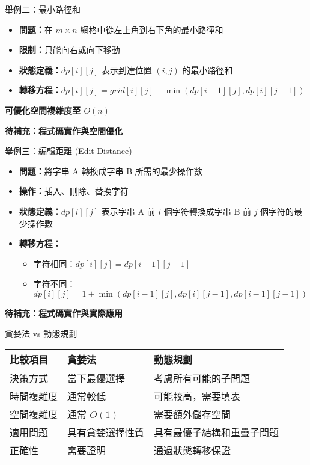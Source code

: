 \documentclass{beamer}
\begin{document}
\begin{frame}{舉例二：最小路徑和}
\begin{itemize}
    \item \textbf{問題：}在 $m \times n$ 網格中從左上角到右下角的最小路徑和
    \item \textbf{限制：}只能向右或向下移動
    \item \textbf{狀態定義：}$dp[i][j]$ 表示到達位置 $(i,j)$ 的最小路徑和
    \item \textbf{轉移方程：}$dp[i][j] = grid[i][j] + \min(dp[i-1][j], dp[i][j-1])$
\end{itemize}

\vspace{1em}
\textbf{可優化空間複雜度至 $O(n)$}

\vspace{1em}
\textbf{待補充：程式碼實作與空間優化}
\end{frame}

\begin{frame}{舉例三：編輯距離 (Edit Distance)}
\begin{itemize}
    \item \textbf{問題：}將字串 A 轉換成字串 B 所需的最少操作數
    \item \textbf{操作：}插入、刪除、替換字符
    \item \textbf{狀態定義：}$dp[i][j]$ 表示字串 A 前 $i$ 個字符轉換成字串 B 前 $j$ 個字符的最少操作數
    \item \textbf{轉移方程：}
    \begin{itemize}
        \item 字符相同：$dp[i][j] = dp[i-1][j-1]$
        \item 字符不同：$dp[i][j] = 1 + \min(dp[i-1][j], dp[i][j-1], dp[i-1][j-1])$
    \end{itemize}
\end{itemize}

\vspace{1em}
\textbf{待補充：程式碼實作與實際應用}
\end{frame}

\begin{frame}{貪婪法 vs 動態規劃}
\begin{center}
\renewcommand{\arraystretch}{1.4}
\begin{tabular}{|>{\centering\arraybackslash}m{2.5cm}|>{\raggedright\arraybackslash}m{4cm}|>{\raggedright\arraybackslash}m{4cm}|}
\hline
\textbf{比較項目} & \textbf{貪婪法} & \textbf{動態規劃} \\
\hline
決策方式 & 當下最優選擇 & 考慮所有可能的子問題 \\
\hline
時間複雜度 & 通常較低 & 可能較高，需要填表 \\
\hline
空間複雜度 & 通常 $O(1)$ & 需要額外儲存空間 \\
\hline
適用問題 & 具有貪婪選擇性質 & 具有最優子結構和重疊子問題 \\
\hline
正確性 & 需要證明 & 通過狀態轉移保證 \\
\hline
\end{tabular}
\end{center}
\end{frame}
\end{document}
